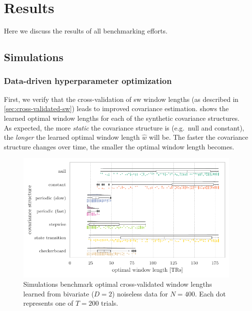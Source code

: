 \clearpage
\section{Results}
\label{sec:benchmarking-results}

Here we discuss the results of all benchmarking efforts.

\subsection{Simulations}
\label{sec:simulations-results}

\subsubsection{Data-driven hyperparameter optimization}

First, we verify that the cross-validation of \gls{sw} window lengths (as described in \cref{sec:cross-validated-sw}) leads to improved covariance estimation.
 shows the learned optimal window lengths for each of the synthetic covariance structures.
As expected, the more \emph{static} the covariance structure is (e.g.~null and constant), the \emph{longer} the learned optimal window length $\hat{w}$ will be.
The faster the covariance structure changes over time, the smaller the optimal window length becomes.


\begin{figure}[ht]
  \centering
  \includegraphics[width=\textwidth]{fig/sim/d2/N0400_T0200/no_noise/SW_cross_validated_optimal_window_lengths}
  \caption{
    Simulations benchmark optimal cross-validated window lengths learned from bivariate ($D = 2$) noiseless data for $N = 400$.
    Each dot represents one of $T = 200$ trials.
  }
  \label{fig:sim-optimal-window-lengths}
\end{figure}


